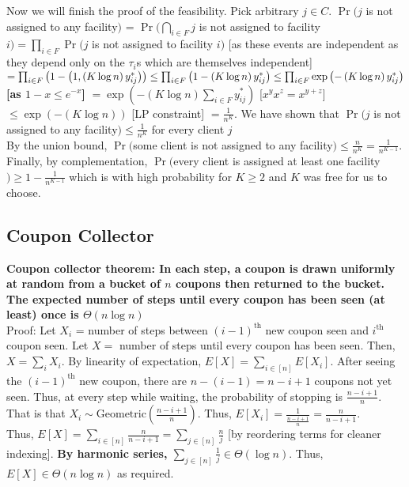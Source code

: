 \documentclass[20pt,a4paper,landscape]{extarticle}
\renewcommand{\th}[1]{#1^\textrm{th}}
\let\min\relax
\DeclareMathOperator*{\min}{min\:}
\begin{document}
\begin{flushleft}
Now we will finish the proof of the feasibility. Pick arbitrary $j \in C$. $\Pr(j$ is not assigned to any facility$)$ = $\Pr(\bigcap_{i \in  F}j$ is not assigned to facility $i) = \prod_{i \in  F} \Pr(j$ is not assigned to facility $i)$ [as these events are independent as they depend only on the $\tau_i$s which are themselves independent] $= \prod_{i \in  F}\left(1 - \min\left(1, \left(K \log n\right) y_{ij}^\ast\right)\right) \leq \prod_{i \in  F}\left(1 - \left(K \log n\right) y_{ij}^\ast\right) \leq \prod_{i \in  F}\exp\left(- \left(K \log n\right) y_{ij}^\ast\right)$ \textbf{[as $1-x \leq e^{-x}$]} $= \exp\left(- \left(K \log n\right) \sum_{i \in F} y_{ij}^\ast\right)$ [$x^yx^z = x^{y+z}$] $\leq \exp\left(- \left(K \log n\right)\right)$ [LP constraint] $= \frac{1}{n^K}$. We have shown that $\Pr(j$ is not assigned to any facility$) \leq \frac{1}{n^K}$ for every client $j$\\
By the union bound, $\Pr($some client is not assigned to any facility$) \leq \frac{n}{n^K} = \frac{1}{n^{K-1}}$. Finally, by complementation, $\Pr($every client is assigned at least one facility$) \geq 1 - \frac{1}{n^{K-1}}$ which is with high probability for $K \geq 2$ and $K$ was free for us to choose.
\subsection{Coupon Collector}
\textbf{Coupon collector theorem: In each step, a coupon is drawn uniformly at random from a bucket of $n$ coupons then returned to the bucket. The expected number of steps until every coupon has been seen (at least) once is $\Theta(n \log n)$}\\
Proof: Let $X_i$ = number of steps between $\th{(i-1)}$ new coupon seen and $\th{i}$ coupon seen. Let $X=$ number of steps until every coupon has been seen. Then, $X = \sum_i X_i$. By linearity of expectation, $E[X] = \sum_{i \in [n]} E[X_i]$. After seeing the $\th{(i-1)}$ new coupon, there are $n-(i-1) = n-i+1$ coupons not yet seen. Thus, at every step while waiting, the probability of stopping is $\frac{n-i+1}{n}$. That is that $X_i \sim \textrm{Geometric}(\frac{n-i+1}{n})$. Thus, $E[X_i] = \frac{1}{\frac{n-i+1}{n}} = \frac{n}{n-i+1}$.\\
Thus, $E[X] = \sum_{i \in [n]} \frac{n}{n-i+1} = \sum_{j \in [n]} \frac{n}{j}$ [by reordering terms for cleaner indexing]. \textbf{By harmonic series, $\sum_{j \in [n]} \frac{1}{j}\in \Theta(\log n)$}. Thus, $E[X] \in \Theta(n \log n)$ as required.

\end{flushleft}
\end{document}
